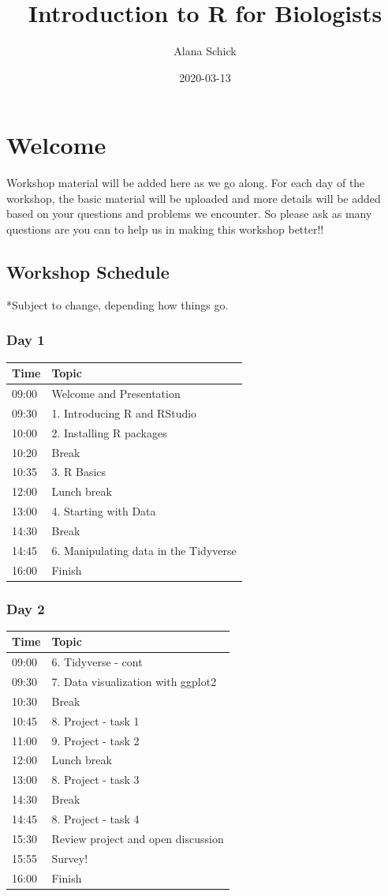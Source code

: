 \documentclass[]{book}
\title{Introduction to R for Biologists}
\author{Alana Schick}
\date{2020-03-13}
\begin{document}
\maketitle

{
\setcounter{tocdepth}{1}
\tableofcontents
}
\hypertarget{welcome}{%
\chapter{Welcome}\label{welcome}}

Workshop material will be added here as we go along. For each day of the workshop, the basic material will be uploaded and more details will be added based on your questions and problems we encounter. So please ask as many questions are you can to help us in making this workshop better!!

\hypertarget{workshop-schedule}{%
\section{Workshop Schedule}\label{workshop-schedule}}

*Subject to change, depending how things go.

\hypertarget{day-1}{%
\subsection*{Day 1}\label{day-1}}

\begin{longtable}[]{@{}ll@{}}
\toprule
Time & Topic\tabularnewline
\midrule
\endhead
09:00 & Welcome and Presentation\tabularnewline
09:30 & 1. Introducing R and RStudio\tabularnewline
10:00 & 2. Installing R packages\tabularnewline
10:20 & Break\tabularnewline
10:35 & 3. R Basics\tabularnewline
12:00 & Lunch break\tabularnewline
13:00 & 4. Starting with Data\tabularnewline
14:30 & Break\tabularnewline
14:45 & 6. Manipulating data in the Tidyverse\tabularnewline
16:00 & Finish\tabularnewline
\bottomrule
\end{longtable}

\hypertarget{day-2}{%
\subsection*{Day 2}\label{day-2}}

\begin{longtable}[]{@{}ll@{}}
\toprule
Time & Topic\tabularnewline
\midrule
\endhead
09:00 & 6. Tidyverse - cont\tabularnewline
09:30 & 7. Data visualization with ggplot2\tabularnewline
10:30 & Break\tabularnewline
10:45 & 8. Project - task 1\tabularnewline
11:00 & 9. Project - task 2\tabularnewline
12:00 & Lunch break\tabularnewline
13:00 & 8. Project - task 3\tabularnewline
14:30 & Break\tabularnewline
14:45 & 8. Project - task 4\tabularnewline
15:30 & Review project and open discussion\tabularnewline
15:55 & Survey!\tabularnewline
16:00 & Finish\tabularnewline
\bottomrule
\end{longtable}
\end{document}

